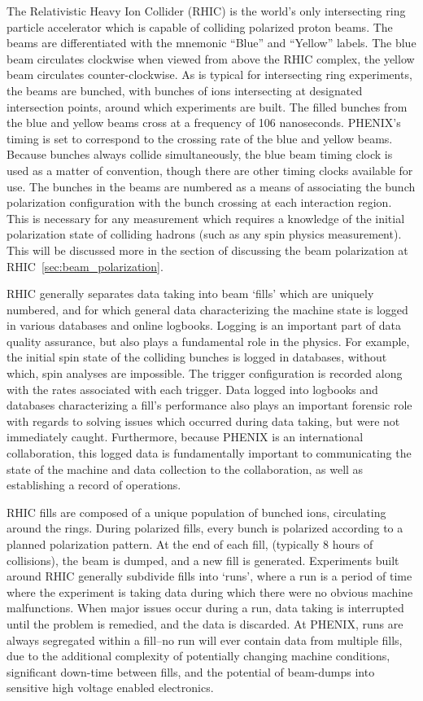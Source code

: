 The Relativistic Heavy Ion Collider (RHIC) is the world's only intersecting ring
particle accelerator which is capable of colliding polarized proton beams. The
beams are differentiated with the mnemonic ``Blue'' and ``Yellow'' labels. The
blue beam circulates clockwise when viewed from above the RHIC complex, the
yellow beam circulates counter-clockwise. As is typical for intersecting ring
experiments, the beams are bunched, with bunches of ions intersecting at
designated intersection points, around which experiments are built.  The filled
bunches from the blue and yellow beams cross at a frequency of 106 nanoseconds.
PHENIX's timing is set to correspond to the crossing rate of the blue and yellow
beams. Because bunches always collide simultaneously, the blue beam timing clock
is used as a matter of convention, though there are other timing clocks
available for use. The bunches in the beams are numbered as a means of
associating the bunch polarization configuration with the bunch crossing at each
interaction region. This is necessary for any measurement which requires a
knowledge of the initial polarization state of colliding hadrons (such as any
spin physics measurement). This will be discussed more in the section of
discussing the beam polarization at RHIC~\ref{sec:beam_polarization}.

RHIC generally separates data taking into beam `fills' which are uniquely
numbered, and for which general data characterizing the machine state is logged
in various databases and online logbooks. Logging is an important part of data
quality assurance, but also plays a fundamental role in the physics. For
example, the initial spin state of the colliding bunches is logged in databases,
without which, spin analyses are impossible. The trigger configuration is
recorded along with the rates associated with each trigger. Data logged into
logbooks and databases characterizing a fill's performance also plays an
important forensic role with regards to solving issues which occurred during
data taking, but were not immediately caught. Furthermore, because PHENIX is an
international collaboration, this logged data is fundamentally important to
communicating the state of the machine and data collection to the collaboration,
as well as establishing a record of operations.  

RHIC fills are composed of a unique population of bunched ions, circulating
around the rings. During polarized fills, every bunch is polarized according to
a planned polarization pattern. At the end of each fill, (typically 8 hours of
collisions), the beam is dumped, and a new fill is generated.  Experiments built
around RHIC generally subdivide fills into `runs', where a run is a period of
time where the experiment is taking data during which there were no obvious
machine malfunctions. When major issues occur during a run, data taking is
interrupted until the problem is remedied, and the data is discarded. At PHENIX,
runs are always segregated within a fill--no run will ever contain data from
multiple fills, due to the additional complexity of potentially changing machine
conditions, significant down-time between fills, and the potential of beam-dumps
into sensitive high voltage enabled electronics.

